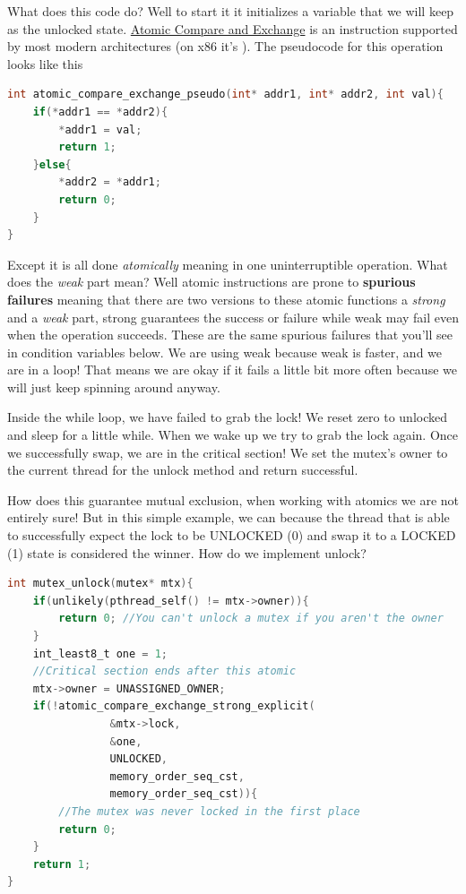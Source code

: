 What does this code do?
Well to start it it initializes a variable that we will keep as the unlocked state.
\href{https://en.wikipedia.org/wiki/Compare-and-swap}{Atomic Compare and Exchange} is an instruction supported by most modern architectures (on x86 it's ).
The pseudocode for this operation looks like this

\begin{lstlisting}[language=C]
int atomic_compare_exchange_pseudo(int* addr1, int* addr2, int val){
    if(*addr1 == *addr2){
        *addr1 = val;
        return 1;
    }else{
        *addr2 = *addr1;
        return 0;
    }
}
\end{lstlisting}

Except it is all done \emph{atomically} meaning in one uninterruptible operation.
What does the \emph{weak} part mean?
Well atomic instructions are prone to \textbf{spurious failures} meaning that there are two versions to these atomic functions a \emph{strong} and a \emph{weak} part, strong guarantees the success or failure while weak may fail even when the operation succeeds.
These are the same spurious failures that you'll see in condition variables below.
We are using weak because weak is faster, and we are in a loop!
That means we are okay if it fails a little bit more often because we will just keep spinning around anyway.

Inside the while loop, we have failed to grab the lock!
We reset zero to unlocked and sleep for a little while.
When we wake up we try to grab the lock again.
Once we successfully swap, we are in the critical section!
We set the mutex's owner to the current thread for the unlock method and return successful.

How does this guarantee mutual exclusion, when working with atomics we are not entirely sure!
But in this simple example, we can because the thread that is able to successfully expect the lock to be UNLOCKED (0) and swap it to a LOCKED (1) state is considered the winner.
How do we implement unlock?

\begin{lstlisting}[language=C]
int mutex_unlock(mutex* mtx){
    if(unlikely(pthread_self() != mtx->owner)){
        return 0; //You can't unlock a mutex if you aren't the owner
    }
    int_least8_t one = 1;
    //Critical section ends after this atomic
    mtx->owner = UNASSIGNED_OWNER;
    if(!atomic_compare_exchange_strong_explicit(
                &mtx->lock,
                &one,
                UNLOCKED,
                memory_order_seq_cst,
                memory_order_seq_cst)){
        //The mutex was never locked in the first place
        return 0;
    }
    return 1;
}
\end{lstlisting}

